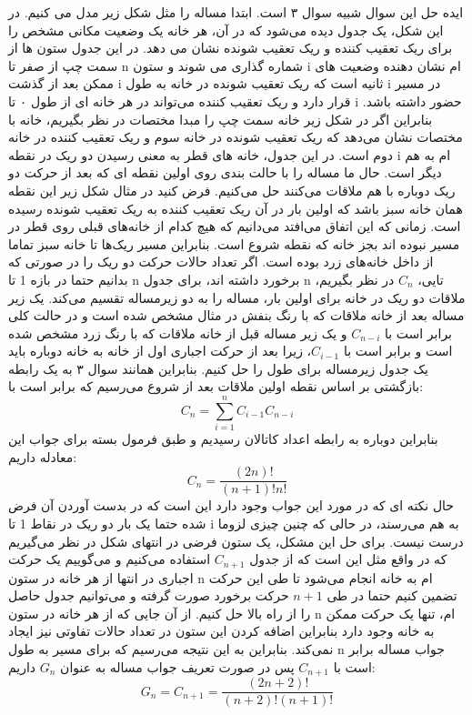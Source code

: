 \p
            ایده حل این سوال شبیه سوال ۳ است. ابتدا مساله را مثل شکل زیر مدل می کنیم. در این شکل، یک جدول دیده می‌شود که در آن، هر خانه یک وضعیت مکانی مشخص را برای ریک تعقیب کننده و ریک تعقیب شونده نشان می دهد. در این جدول ستون ها از سمت چپ از صفر تا n شماره گذاری می شوند و ستون i ام نشان دهنده وضعیت های ممکن بعد از گذشت i ثانیه است که ریک تعقیب شونده در خانه به طول i در مسیر قرار دارد و ریک تعقیب کننده می‌تواند در هر خانه ای از طول ۰ تا i حضور داشته باشد. بنابراین اگر در شکل زیر خانه سمت چپ را مبدا مختصات در نظر بگیریم، خانه با مختصات  نشان می‌دهد که ریک تعقیب شونده در خانه سوم و ریک تعقیب کننده در خانه دوم است. در این جدول، خانه های قطر  به معنی رسیدن دو ریک در نقطه i ام به هم دیگر است. حال ما مساله را با حالت بندی روی اولین نقطه ای که بعد از حرکت دو ریک دوباره با هم ملاقات می‌کنند حل می‌کنیم. فرض کنید در مثال شکل زیر این نقطه همان خانه سبز باشد که اولین بار در آن ریک تعقیب کننده به ریک تعقیب شونده رسیده است. زمانی که این اتفاق می‌افتد می‌دانیم که هیچ کدام از خانه‌های قبلی روی قطر در مسیر نبوده اند بجز خانه  که نقطه شروع است. بنابراین مسیر ریک‌ها تا خانه سبز‌ تماما از داخل خانه‌های زرد بوده است. اگر تعداد حالات حرکت دو ریک را در صورتی که بدانیم حتما در بازه 1 تا n برخورد داشته اند، برای جدول n تایی، \( C_n \) در نظر بگیریم، ملاقات دو ریک در خانه  برای اولین بار، مساله را به دو زیرمساله تقسیم می‌کند. یک زیر مساله بعد از خانه ملاقات که با رنگ بنفش در مثال مشخص شده است و در حالت کلی برابر است با \( C_{n-i} \) و یک زیر مساله قبل از خانه ملاقات که با رنگ زرد مشخص شده است و برابر است با \( C_{i-1} \)، زیرا بعد از حرکت اجباری اول از خانه  به خانه  دوباره باید یک جدول زیرمساله برای طول  را حل کنیم. بنابراین همانند سوال ۳ به یک رابطه بازگشتی بر اساس نقطه اولین ملاقات بعد از شروع می‌رسیم که برابر است با:
            \[ C_n = \sum\limits_{i=1}^{n} C_{i-1}C_{n-i} \]بنابراین دوباره به رابطه اعداد کاتالان رسیدیم و طبق فرمول بسته برای جواب این معادله داریم:
            \[ C_n = \frac{(2n)!}{(n+1)!n!} \]حال نکته ای که در مورد این جواب وجود دارد این است که در بدست آوردن آن فرض شده حتما یک بار دو ریک در نقاط 1 تا i به هم می‌رسند، در حالی که چنین چیزی لزوما درست نیست. برای حل این مشکل، یک ستون فرضی در انتهای شکل در نظر می‌گیریم که در واقع مثل این است که از جدول \( C_{n+1} \) استفاده می‌کنیم و می‌گوییم یک حرکت اجباری در انتها از هر خانه در ستون n ام به خانه  انجام می‌شود تا طی این حرکت تضمین کنیم حتما در طی \( n+1 \) حرکت برخورد صورت گرفته و می‌توانیم جدول حاصل را از راه بالا حل کنیم. از آن جایی که از هر خانه در ستون n ام، تنها یک حرکت ممکن به خانه  وجود دارد بنابراین اضافه کردن این ستون در تعداد حالات تفاوتی نیز ایجاد نمی‌کند. بنابراین به این نتیجه می‌رسیم که برای مسیر به طول n جواب مساله برابر است با \( C_{n+1} \) پس در صورت تعریف جواب مساله به عنوان \( G_n \) داریم:
            \[ G_n = C_{n+1} = \frac{(2n+2)!}{(n+2)!(n+1)!} \]
            \p 
